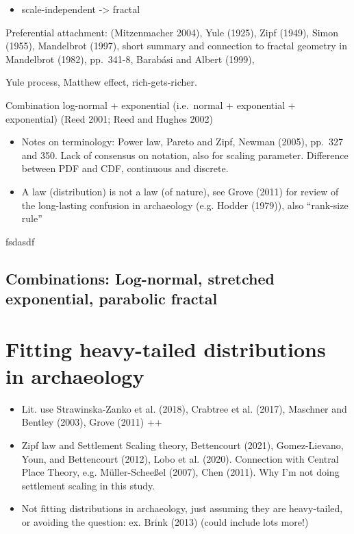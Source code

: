 \documentclass[
  12pt,
]{book}
\providecommand{\tightlist}{%
  \setlength{\itemsep}{0pt}\setlength{\parskip}{0pt}}
\begin{document}
\begin{itemize}
\tightlist
\item
  scale-independent -\textgreater{} fractal
\end{itemize}

Preferential attachment: (Mitzenmacher 2004), Yule (1925), Zipf (1949), Simon (1955), Mandelbrot (1997), short summary and connection to fractal geometry in Mandelbrot (1982), pp.~341-8, Barabási and Albert (1999),

Yule process, Matthew effect, rich-gets-richer.

Combination log-normal + exponential (i.e.~normal + exponential + exponential) (Reed 2001; Reed and Hughes 2002)

\begin{itemize}
\item
  Notes on terminology: Power law, Pareto and Zipf, Newman (2005), pp.~327 and 350. Lack of consensus on notation, also for scaling parameter. Difference between PDF and CDF, continuous and discrete.
\item
  A law (distribution) is not a law (of nature), see Grove (2011) for review of the long-lasting confusion in archaeology (e.g. Hodder (1979)), also ``rank-size rule''
\end{itemize}

fsdasdf

\hypertarget{combinations-log-normal-stretched-exponential-parabolic-fractal}{%
\subsection{Combinations: Log-normal, stretched exponential, parabolic fractal}\label{combinations-log-normal-stretched-exponential-parabolic-fractal}}

\hypertarget{distfit-archaeo}{%
\section{Fitting heavy-tailed distributions in archaeology}\label{distfit-archaeo}}

\begin{itemize}
\item
  Lit. use Strawinska-Zanko et al. (2018), Crabtree et al. (2017), Maschner and Bentley (2003), Grove (2011) ++
\item
  Zipf law and Settlement Scaling theory, Bettencourt (2021), Gomez-Lievano, Youn, and Bettencourt (2012), Lobo et al. (2020). Connection with Central Place Theory, e.g. Müller-Scheeßel (2007), Chen (2011). Why I'm not doing settlement scaling in this study.
\item
  Not fitting distributions in archaeology, just assuming they are heavy-tailed, or avoiding the question: ex. Brink (2013) (could include lots more!)
\end{itemize}
\end{document}
